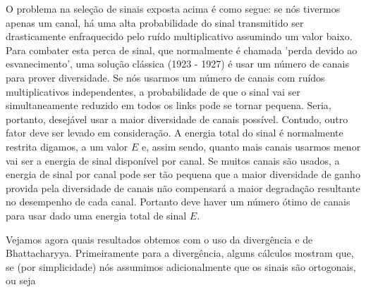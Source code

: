 \documentclass{sbrt2017port}
\begin{document}
O problema na seleção de sinais exposta acima é como segue: se nós tivermos apenas um canal, há uma alta probabilidade do sinal transmitido ser drasticamente enfraquecido pelo ruído multiplicativo assumindo um valor baixo. Para combater esta perca de sinal, que normalmente é chamada 'perda devido ao esvanecimento', uma solução clássica (1923 - 1927) é usar um número de canais para prover diversidade. Se nós usarmos um número de canais com ruídos multiplicativos independentes, a probabilidade de que o sinal vai ser simultaneamente reduzido em todos os links pode se tornar pequena. Seria, portanto, desejável usar a maior diversidade de canais possível. Contudo, outro fator deve ser levado em consideração. A energia total do sinal é normalmente restrita digamos, a um valor $E$ e, assim sendo, quanto mais canais usarmos menor vai ser a energia de sinal disponível por canal. Se muitos canais são usados, a energia de sinal por canal pode ser tão pequena que a maior diversidade de ganho provida 
pela diversidade de canais não compensará a maior degradação resultante no desempenho de cada canal. Portanto deve haver um número ótimo de canais para usar dado uma energia total de sinal $E$.

Vejamos agora quais resultados obtemos com o uso da divergência e de Bhattacharyya. Primeiramente para a divergência, alguns cálculos mostram que, se (por simplicidade) nós assumimos adicionalmente que os sinais são ortogonais, ou seja
\end{document}
